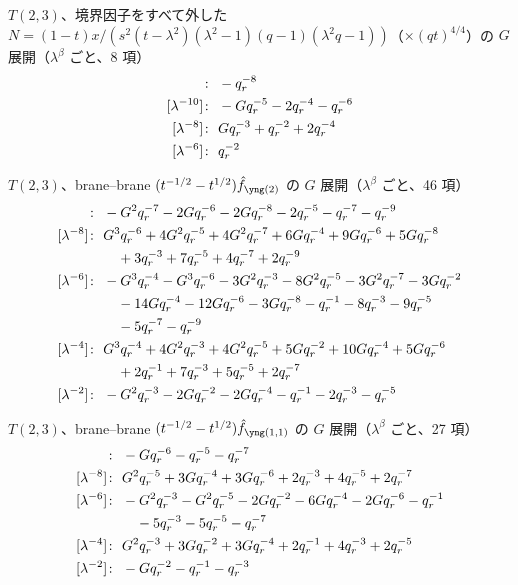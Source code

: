 $T(2,3)$、境界因子をすべて外した $N = (1-t)x/(s^2(t-\lambda^2)(\lambda^2-1)(q-1)(\lambda^2q-1))$（$\times (qt)^{4/4}$）の $G$ 展開（$\lambda^\beta$ ごと、8 項）
\begin{align*}
[\lambda^{-12}]\colon\ & -\qr^{-8} \\
[\lambda^{-10}]\colon\ & -G \qr^{-5} -2 \qr^{-4} -\qr^{-6} \\
[\lambda^{-8}]\colon\ & G \qr^{-3} +\qr^{-2} +2 \qr^{-4} \\
[\lambda^{-6}]\colon\ & \qr^{-2}
\end{align*}

$T(2,3)$、brane--brane $(t^{-1/2} - t^{1/2})\hat f_{\ytwo}$ の $G$ 展開（$\lambda^\beta$ ごと、46 項）
\begin{align*}
[\lambda^{-10}]\colon\ & -G^{2} \qr^{-7} -2 G \qr^{-6} -2 G \qr^{-8} -2 \qr^{-5} -\qr^{-7} -\qr^{-9} \\
[\lambda^{-8}]\colon\ & G^{3} \qr^{-6} +4 G^{2} \qr^{-5} +4 G^{2} \qr^{-7} +6 G \qr^{-4} +9 G \qr^{-6} +5 G \qr^{-8} \\
& \quad +3 \qr^{-3} +7 \qr^{-5} +4 \qr^{-7} +2 \qr^{-9} \\
[\lambda^{-6}]\colon\ & -G^{3} \qr^{-4} -G^{3} \qr^{-6} -3 G^{2} \qr^{-3} -8 G^{2} \qr^{-5} -3 G^{2} \qr^{-7} -3 G \qr^{-2} \\
& \quad -14 G \qr^{-4} -12 G \qr^{-6} -3 G \qr^{-8} -\qr^{-1} -8 \qr^{-3} -9 \qr^{-5} \\
& \quad -5 \qr^{-7} -\qr^{-9} \\
[\lambda^{-4}]\colon\ & G^{3} \qr^{-4} +4 G^{2} \qr^{-3} +4 G^{2} \qr^{-5} +5 G \qr^{-2} +10 G \qr^{-4} +5 G \qr^{-6} \\
& \quad +2 \qr^{-1} +7 \qr^{-3} +5 \qr^{-5} +2 \qr^{-7} \\
[\lambda^{-2}]\colon\ & -G^{2} \qr^{-3} -2 G \qr^{-2} -2 G \qr^{-4} -\qr^{-1} -2 \qr^{-3} -\qr^{-5}
\end{align*}

$T(2,3)$、brane--brane $(t^{-1/2} - t^{1/2})\hat f_{\yoneone}$ の $G$ 展開（$\lambda^\beta$ ごと、27 項）
\begin{align*}
[\lambda^{-10}]\colon\ & -G \qr^{-6} -\qr^{-5} -\qr^{-7} \\
[\lambda^{-8}]\colon\ & G^{2} \qr^{-5} +3 G \qr^{-4} +3 G \qr^{-6} +2 \qr^{-3} +4 \qr^{-5} +2 \qr^{-7} \\
[\lambda^{-6}]\colon\ & -G^{2} \qr^{-3} -G^{2} \qr^{-5} -2 G \qr^{-2} -6 G \qr^{-4} -2 G \qr^{-6} -\qr^{-1} \\
& \quad -5 \qr^{-3} -5 \qr^{-5} -\qr^{-7} \\
[\lambda^{-4}]\colon\ & G^{2} \qr^{-3} +3 G \qr^{-2} +3 G \qr^{-4} +2 \qr^{-1} +4 \qr^{-3} +2 \qr^{-5} \\
[\lambda^{-2}]\colon\ & -G \qr^{-2} -\qr^{-1} -\qr^{-3}
\end{align*}

